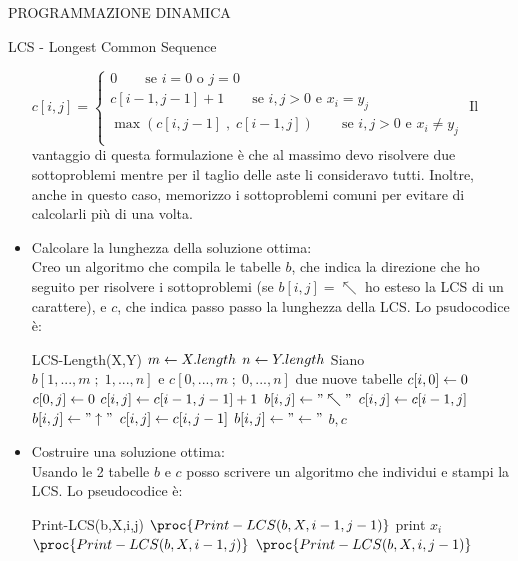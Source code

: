 \documentclass[8pt]{extarticle}
\begin{document}
\begin{formulario}
\begin{myParagraph}{PROGRAMMAZIONE DINAMICA}
\begin{subParagraph}{LCS - Longest Common Sequence}
\begin{itemize}
\small{$c[i,j]=		
\begin{cases}
		0 \qquad \text{se } i=0 \text{ o } j=0 \\
		c[i-1,j-1]+1 \qquad \text{se } i,j>0 \text{ e } x_i=y_j \\
		\max (c[i,j-1]\;,\;c[i-1,j]) \qquad \text{se } i,j>0 \text{ e } x_i \neq y_j \\
\end{cases}$}
Il vantaggio di questa formulazione è che al massimo devo risolvere due sottoproblemi mentre per il taglio delle aste li consideravo tutti. Inoltre, anche in questo caso, memorizzo i sottoproblemi comuni per evitare di calcolarli più di una volta.
		\item Calcolare la lunghezza della soluzione ottima:\\
Creo un algoritmo che compila le tabelle $b$, che indica la direzione che ho seguito per risolvere i sottoproblemi (se $b[i,j]=\nwarrow$ ho esteso la LCS di un carattere), e $c$, che indica passo passo la lunghezza della LCS. Lo psudocodice è:
				\begin{code}{LCS-Length(X,Y)}
\li $m \leftarrow X.length$
\li $n \leftarrow Y.length$
\li Siano $b[1,...,m\; ; \;1,...,n] \text{ e } c[0,...,m\; ; \;0,...,n]$ due nuove tabelle
\li {}
	\li $c[i,0] \leftarrow 0$
\END
\li {}
	\li $c[0,j] \leftarrow 0$
\END
\li {}
	\li {}
		\li {}
			\li $c[i,j] \leftarrow c[i-1,j-1]+1$
			\li $b[i,j] \leftarrow "\nwarrow"$
		\li {}
			\li $c[i,j] \leftarrow c[i-1,j]$
			\li $b[i,j] \leftarrow "\uparrow"$
		\li \ELSE
			\li $c[i,j] \leftarrow c[i,j-1]$
			\li $b[i,j] \leftarrow "\leftarrow"$
		\END
	\END
\END
\li \RETURN $b,c$
				\end{code}
		\item Costruire una soluzione ottima:\\
Usando le 2 tabelle $b$ e $c$ posso scrivere un algoritmo che individui e stampi la LCS. Lo pseudocodice è:
				\begin{code}{Print-LCS(b,X,i,j)}
\li {}
	\li \RETURN
\END
\li {}
	\li $\proc{Print-LCS(b,X,i-1,j-1)}$
	\li print $x_i$
\li {}
	\li $\proc{Print-LCS(b,X,i-1,j)}$
\li \ELSE
	\li $\proc{Print-LCS(b,X,i,j-1)}$
\END
				\end{code}
			\end{itemize}
		\end{subParagraph}


\end{myParagraph}
\end{formulario}
\end{document}

